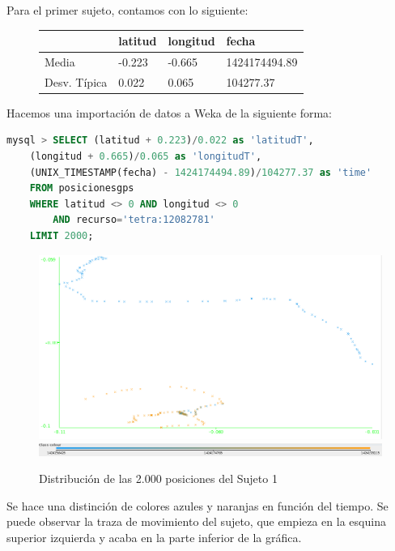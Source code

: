 \documentclass[a4paper, 12pt]{article}
\begin{document}
Para el primer sujeto, contamos con lo siguiente:

\begin{figure}[H]
	\begin{tabular}{| l | l | l | l |}
	\hline
	\rowcolor{LightCyan}
	\hline
  		& latitud & longitud & fecha \\
	\hline
	\hline
		Media & -0.223 & -0.665 & 1424174494.89 \\
		Desv. T\'ipica & 0.022 & 0.065	& 104277.37 \\
	\hline
	\end{tabular}
\end{figure}

Hacemos una importaci\'on de datos a Weka de la siguiente forma:\\

\begin{lstlisting}[language=sql, columns=fullflexible, basicstyle=\small, frame=tblr]
mysql > SELECT (latitud + 0.223)/0.022 as 'latitudT', 
	(longitud + 0.665)/0.065 as 'longitudT',
	(UNIX_TIMESTAMP(fecha) - 1424174494.89)/104277.37 as 'time'
	FROM posicionesgps
	WHERE latitud <> 0 AND longitud <> 0 
		AND recurso='tetra:12082781'
	LIMIT 2000;
\end{lstlisting}

\begin{figure}[H]
	\includegraphics[scale=.5]{../comparativa/sujeto1.png}
	\includegraphics[scale=.4]{../comparativa/leyenda.png}
	\caption{Distribuci\'on de las 2.000 posiciones del Sujeto 1}
\end{figure}

Se hace una distinci\'on de colores azules y naranjas en funci\'on del tiempo. Se puede observar la traza de movimiento del sujeto, que empieza en la esquina superior izquierda y acaba en la parte inferior de la gr\'afica. \\
\end{document}
